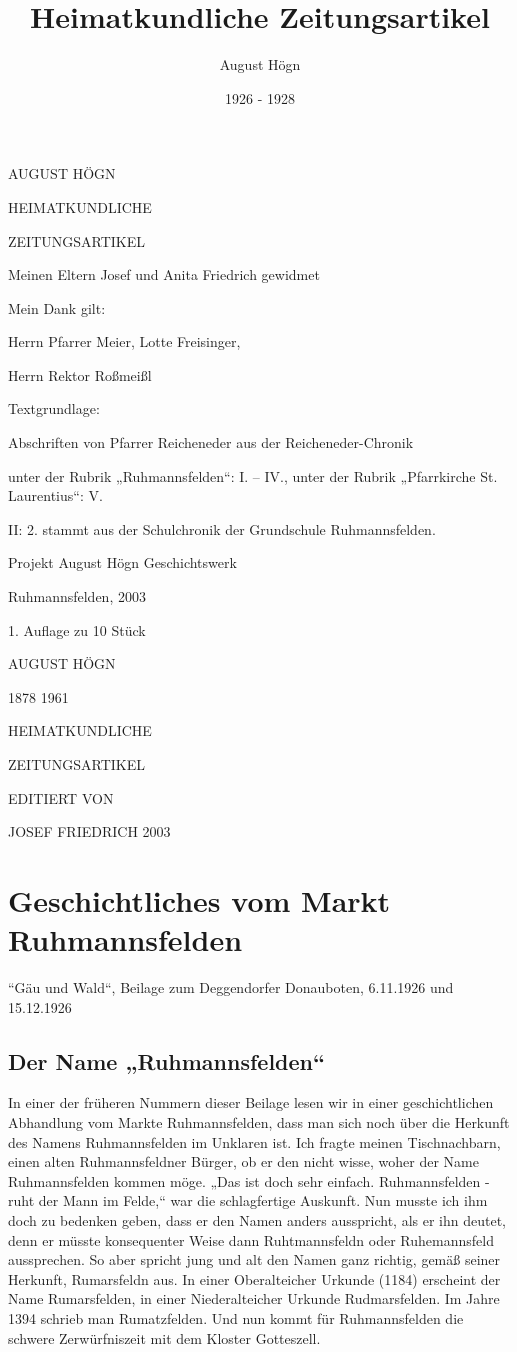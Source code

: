 \documentclass[12pt,a4paper]{book}
\author{August Högn}
\title{Heimatkundliche Zeitungsartikel}
\date{1926 - 1928}
\begin{document}
\maketitle

AUGUST HÖGN

HEIMATKUNDLICHE

ZEITUNGSARTIKEL

Meinen Eltern Josef und Anita Friedrich gewidmet


Mein Dank gilt:

Herrn Pfarrer Meier, Lotte Freisinger,

Herrn Rektor Roßmeißl

Textgrundlage:

Abschriften von Pfarrer Reicheneder aus der Reicheneder-Chronik

unter der Rubrik „Ruhmannsfelden“: I. – IV., unter der Rubrik „Pfarrkirche St.
Laurentius“: V.

II: 2. stammt aus der Schulchronik der Grundschule Ruhmannsfelden.


Projekt August Högn Geschichtswerk

Ruhmannsfelden, 2003

1. Auflage zu 10 Stück

AUGUST HÖGN

1878 1961


HEIMATKUNDLICHE

ZEITUNGSARTIKEL



EDITIERT VON

JOSEF FRIEDRICH 2003

\tableofcontents

\newpage

\part{Geschichtliches vom Markt Ruhmannsfelden}

“Gäu und Wald“, Beilage zum Deggendorfer Donauboten, 6.11.1926 und 15.12.1926

\chapter{Der Name „Ruhmannsfelden“}

In einer der früheren Nummern dieser Beilage lesen wir in einer geschichtlichen
Abhandlung vom Markte Ruhmannsfelden, dass man sich noch über die Herkunft des
Namens Ruhmannsfelden im Unklaren ist. Ich fragte meinen Tischnachbarn, einen
alten Ruhmannsfeldner Bürger, ob er den nicht wisse, woher der Name
Ruhmannsfelden kommen möge. „Das ist doch sehr einfach. Ruhmannsfelden - ruht
der Mann im Felde,“ war die schlagfertige Auskunft. Nun musste ich ihm doch zu
bedenken geben, dass er den Namen anders ausspricht, als er ihn deutet, denn er
müsste konsequenter Weise dann Ruhtmannsfeldn oder Ruhemannsfeld aussprechen. So
aber spricht jung und alt den Namen ganz richtig, gemäß seiner Herkunft,
Rumarsfeldn aus. In einer Oberalteicher Urkunde (1184) erscheint der Name
Rumarsfelden, in einer Niederalteicher Urkunde Rudmarsfelden. Im Jahre 1394
schrieb man Rumatzfelden. Und nun kommt für Ruhmannsfelden die schwere
Zerwürfniszeit mit dem Kloster Gotteszell.
\end{document}
